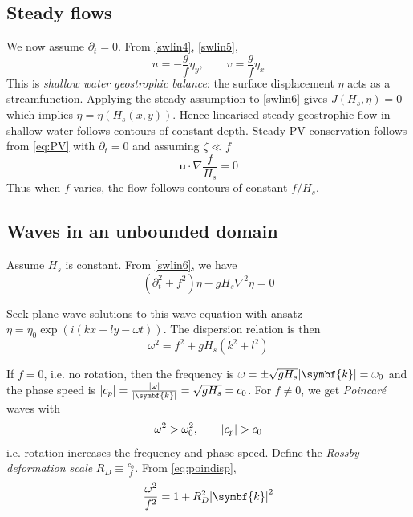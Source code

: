 \documentclass{jknotes}
\begin{document}
\subsection{Steady flows}
We now assume $\partial_t = 0$. From \eqref{swlin4}, \eqref{swlin5},
\begin{equation}
	u = -\frac{g}{f}\eta_y, \hspace{2em} v = \frac{g}{f}\eta_x
\end{equation}
This is \emph{shallow water geostrophic balance}: the surface displacement
$\eta$ acts as a streamfunction. Applying the steady assumption to
\eqref{swlin6} gives $J(H_s, \eta) = 0$ which implies $\eta = \eta(H_s(x,y))$.
Hence linearised steady geostrophic flow in shallow water follows contours of
constant depth.  Steady PV conservation follows from \eqref{eq:PV} with
$\partial_t = 0$ and assuming $\zeta \ll f$
\begin{equation}
	\symbf{u} \cdot \nabla \frac{f}{H_s} = 0
\end{equation}
Thus when $f$ varies, the flow follows contours of constant $f/H_s$.

\subsection{Waves in an unbounded domain}
Assume $H_s$ is constant. From \eqref{swlin6}, we have
\begin{equation}
	\left( \partial_t^2 + f^2\right)\eta - gH_s \nabla^2 \eta = 0
\end{equation}

Seek plane wave solutions to this wave equation with ansatz $\eta = \eta_0
\exp(i(kx+ly-\omega t))$. The dispersion relation is then
\begin{equation}
	\omega^2 = f^2 + gH_s (k^2 + l^2) \label{eq:poindisp}
\end{equation}

If $f = 0$, i.e. no rotation, then the frequency is $\omega = \pm \sqrt{gH_s}
\abs{\symbf{k}} = \omega_0$ and the phase speed is $\abs{c_p} =
\frac{\abs{\omega}}{\abs{\symbf{k}}} = \sqrt{gH_s} = c_0$. For $f \ne 0$, we get
\emph{Poincar\'{e}} waves with
\begin{equation}
	\omega^2 > \omega_0^2, \hspace{2em} \abs{c_p} > c_0
\end{equation}
i.e. rotation increases the frequency and phase speed. Define the \emph{Rossby
deformation scale} $R_D \equiv \frac{c_0}{f}$. From \eqref{eq:poindisp},
\begin{equation}
	\frac{\omega^2}{f^2} = 1 + R^2_D \abs{\symbf{k}}^2
\end{equation}
\end{document}
